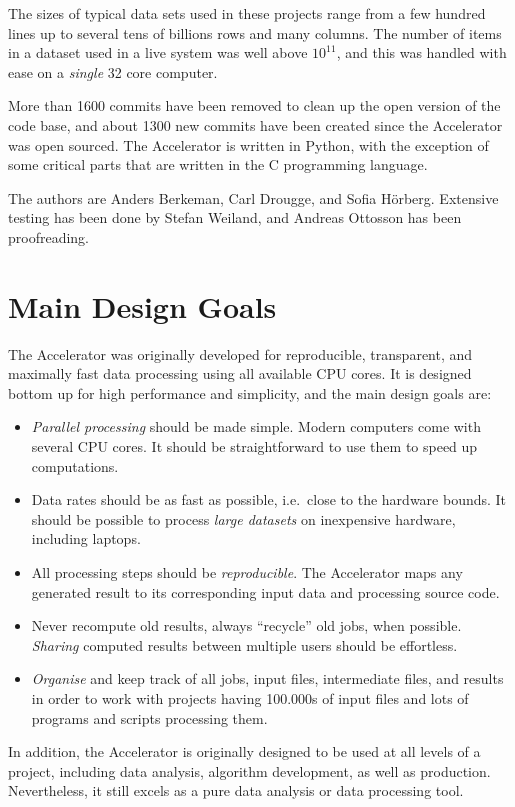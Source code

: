 The sizes of typical data sets used in these projects range from a few
hundred lines up to several tens of billions rows and many columns.
The number of items in a dataset used in a live system was well above
$10^{11}$, and this was handled with ease on a \emph{single} 32 core
computer.

More than 1600 commits have been removed to clean up the open version
of the code base, and about 1300 new commits have been created since
the Accelerator was open sourced.  The Accelerator is written in
Python, with the exception of some critical parts that are written in
the C programming language.

The authors are Anders Berkeman, Carl Drougge, and Sofia H\"orberg.
Extensive testing has been done by Stefan Weiland, and Andreas
Ottosson has been proofreading.



\section{Main Design Goals}
The Accelerator was originally developed for reproducible,
transparent, and maximally fast data processing using all available
CPU cores.  It is designed bottom up for high performance and
simplicity, and the main design goals are:
\begin{itemize}

\item[] \textsl{Parallel processing} should be made simple.  Modern computers
  come with several CPU cores.  It should be straightforward to use
  them to speed up computations.
  
\item[] Data rates should be as fast as possible, i.e.\ close to the hardware
  bounds.  It should be possible to process \textsl{large datasets} on
  inexpensive hardware, including laptops.

\item[] All processing steps should be \textsl{reproducible}.
  The Accelerator maps any generated result to its corresponding input
  data and processing source code.

\item[] Never recompute old results, always ``recycle'' old jobs, when
  possible.  \textsl{Sharing} computed results between multiple users
  should be effortless.

\item[] \textsl{Organise} and keep track of all jobs, input files,
  intermediate files, and results in order to work with projects having
  100.000s of input files and lots of programs and scripts processing
  them.
  
\end{itemize}
In addition, the Accelerator is originally designed to be used at all
levels of a project, including data analysis, algorithm development,
as well as production.  Nevertheless, it still excels as a pure data
analysis or data processing tool.
